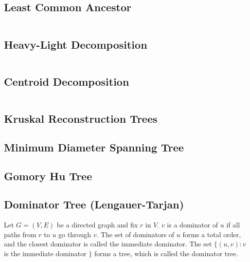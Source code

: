 \subsection{Least Common Ancestor}

\hrulefill
\begin{multicols}{2}
\inputminted[autogobble,fontsize=\footnotesize]{C++}{Trees/lca.cpp}
\end{multicols}
\hrulefill

\newpage

\subsection{Heavy-Light Decomposition}

\hrulefill
\begin{multicols}{2}
\inputminted[autogobble,fontsize=\footnotesize]{C++}{Trees/hld.cpp}
\end{multicols}
\hrulefill

\subsection{Centroid Decomposition}

\hrulefill
\begin{multicols}{2}
\inputminted[autogobble,fontsize=\footnotesize]{C++}{Trees/centroid.cpp}
\end{multicols}
\hrulefill

\subsection{Kruskal Reconstruction Trees}
\subsection{Minimum Diameter Spanning Tree}
\subsection{Gomory Hu Tree}

\newpage

\subsection{Dominator Tree (Lengauer-Tarjan)}

Let $G = (V, E)$ be a directed graph and fix $r$ in $V$.
$v$ is a dominator of $u$ if all paths from $r$ to $u$ go through $v$.
The set of dominators of $u$ forms a total order, and 
the closest dominator is called the immediate dominator.
The set $\{ (u,v) : v$ is the immediate dominator $\}$ forms a tree, 
which is called the dominator tree. \cite{TarjanLengauer1979Jan}

